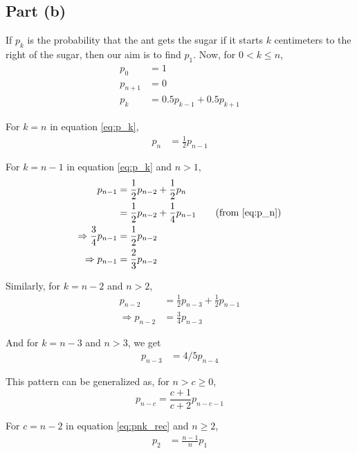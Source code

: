 \documentclass[11pt,a4paper,titlepage]{article}
\begin{document}
\subsection*{Part (b)}

If $p_k$ is the probability that the ant gets the sugar if it starts $k$
centimeters to the right of the sugar, then our aim is to find $p_1$.
Now, for $0 < k \le n$,
\begin{align}
    p_0 &= 1 \nonumber \\
    p_{n+1} &= 0 \label{eq:p_n1} \\
    p_k &= 0.5 p_{k-1} + 0.5 p_{k+1} \label{eq:p_k}
\end{align}

For $k = n$ in equation \ref{eq:p_k},
\begin{align}
    p_n &= \frac{1}{2} p_{n-1} \label{eq:p_n}
\end{align}

For $k = n - 1$ in equation \ref{eq:p_k} and $n > 1$,
\begin{align*}
    p_{n-1} &= \frac{1}{2} p_{n-2} + \frac{1}{2} p_n \\
            &= \frac{1}{2} p_{n-2} + \frac{1}{4} p_{n-1} \tag{from \ref{eq:p_n}} \\
    \Rightarrow \frac{3}{4} p_{n-1} &= \frac{1}{2} p_{n-2} \\
    \Rightarrow p_{n-1} &= \frac{2}{3} p_{n-2}
\end{align*}

Similarly, for $k = n - 2$ and $n > 2$,
\begin{align*}
    p_{n-2} &= \frac{1}{2} p_{n-3} + \frac{1}{2} p_{n-1} \\
    \Rightarrow p_{n-2} &= \frac{3}{4} p_{n-3}
\end{align*}

And for $k = n - 3$ and $n > 3$, we get
\begin{align*}
    p_{n-3} &= 4/5 p_{n-4}
\end{align*}

This pattern can be generalized as, for $n > c \ge 0$,
\begin{equation}\label{eq:pnk_rec}
    p_{n-c} = \frac{c + 1}{c + 2} p_{n-c-1}
\end{equation}

For $c = n - 2$ in equation \ref{eq:pnk_rec} and $n \ge 2$,
\begin{align}
    p_2 &= \frac{n - 1}{n} p_1 \label{eq:p_2}
\end{align}
\end{document}
